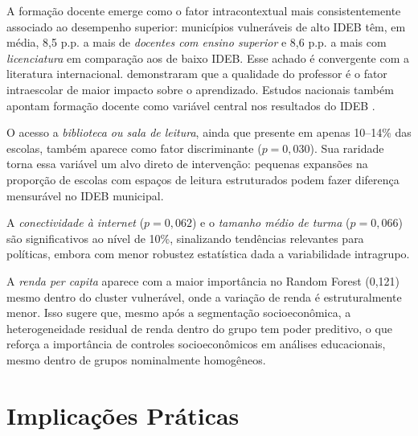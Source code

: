 A formação docente emerge como o fator intracontextual mais consistentemente associado ao desempenho superior: municípios vulneráveis de alto IDEB têm, em média, 8,5 p.p. a mais de \textit{docentes com ensino superior} e 8,6 p.p. a mais com \textit{licenciatura} em comparação aos de baixo IDEB. Esse achado é convergente com a literatura internacional. \citet{rivkin2005} demonstraram que a qualidade do professor é o fator intraescolar de maior impacto sobre o aprendizado. Estudos nacionais também apontam formação docente como variável central nos resultados do IDEB \cite{vasconcelos2021}.

O acesso a \textit{biblioteca ou sala de leitura}, ainda que presente em apenas 10--14\% das escolas, também aparece como fator discriminante ($p = 0{,}030$). Sua raridade torna essa variável um alvo direto de intervenção: pequenas expansões na proporção de escolas com espaços de leitura estruturados podem fazer diferença mensurável no IDEB municipal.

A \textit{conectividade à internet} ($p = 0{,}062$) e o \textit{tamanho médio de turma} ($p = 0{,}066$) são significativos ao nível de 10\%, sinalizando tendências relevantes para políticas, embora com menor robustez estatística dada a variabilidade intragrupo.

A \textit{renda per capita} aparece com a maior importância no Random Forest (0,121) mesmo dentro do cluster vulnerável, onde a variação de renda é estruturalmente menor. Isso sugere que, mesmo após a segmentação socioeconômica, a heterogeneidade residual de renda dentro do grupo tem poder preditivo, o que reforça a importância de controles socioeconômicos em análises educacionais, mesmo dentro de grupos nominalmente homogêneos.

\section{Implicações Práticas}

